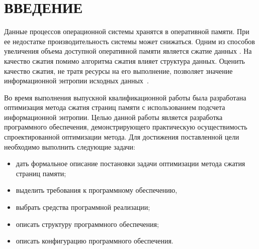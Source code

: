 \chapter*{ВВЕДЕНИЕ}

Данные процессов операционной системы хранятся в оперативной памяти. При ее недостатке производительность системы может снижаться. Одним из способов увеличения объема доступной оперативной памяти является сжатие данных \cite{swapping}. На качество сжатия помимо алгоритма сжатия влияет структура данных. Оценить качество сжатия, не тратя ресурсы на его выполнение, позволяет значение информационной энтропии исходных данных~\cite{theorem}.

Во время выполнения выпускной квалификационной работы была разработана оптимизация метода сжатия страниц памяти с использованием подсчета информационной энтропии. Целью данной работы является разработка программного обеспечения, демонстрирующего практическую осуществимость спроектированной оптимизации метода. Для достижения поставленной цели необходимо выполнить следующие задачи:

\begin{itemize}
	\item дать формальное описание постановки задачи оптимизации метода сжатия страниц памяти;
	\item выделить требования к программному обеспечению, 
	\item выбрать средства программной реализации;
    \item описать структуру программного обеспечения;
	\item описать конфигурацию программного обеспечения.
\end{itemize}
